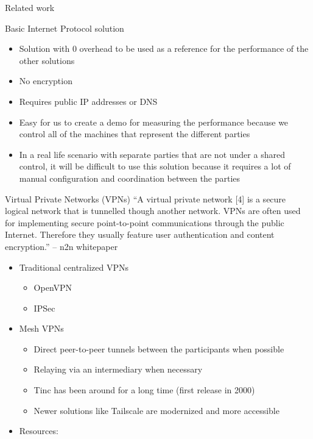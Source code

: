 \begin{frame}[fragile]{Related work}
\begin{block}{Basic Internet Protocol solution}
\protect\hypertarget{basic-internet-protocol-solution}{}
\begin{itemize}
\tightlist
\item
  Solution with 0 overhead to be used as a reference for the performance
  of the other solutions
\item
  No encryption
\item
  Requires public IP addresses or DNS
\item
  Easy for us to create a demo for measuring the performance because we
  control all of the machines that represent the different parties
\item
  In a real life scenario with separate parties that are not under a
  shared control, it will be difficult to use this solution because it
  requires a lot of manual configuration and coordination between the
  parties
\end{itemize}
\end{block}

\begin{block}{Virtual Private Networks (VPNs)}
\protect\hypertarget{virtual-private-networks-vpns}{}
``A virtual private network {[}4{]} is a secure logical network that is
tunnelled though another network. VPNs are often used for implementing
secure point-to-point communications through the public Internet.
Therefore they usually feature user authentication and content
encryption.'' -- n2n whitepaper

\begin{itemize}
\tightlist
\item
  Traditional centralized VPNs

  \begin{itemize}
  \tightlist
  \item
    OpenVPN
  \item
    IPSec
  \end{itemize}
\item
  Mesh VPNs

  \begin{itemize}
  \tightlist
  \item
    Direct peer-to-peer tunnels between the participants when possible
  \item
    Relaying via an intermediary when necessary
  \item
    Tinc has been around for a long time (first release in 2000)
  \item
    Newer solutions like Tailscale are modernized and more accessible
  \end{itemize}
\item
  Resources:


\end{itemize}
\end{block}
\end{frame}
